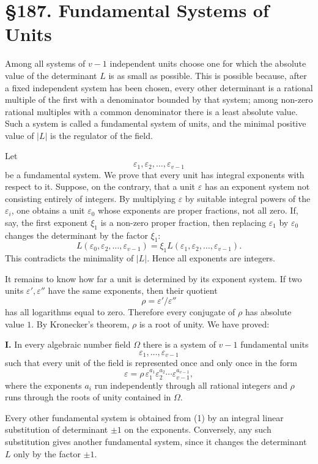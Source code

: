 \documentclass[11pt,a4paper]{book}
\newcommand{\webersection}[2]{\clearpage\section*{\S #1. #2}}
\begin{document}
\webersection{187}{Fundamental Systems of Units}

Among all systems of \(v-1\) independent units choose one for which the absolute value of the determinant \(L\) is as small as possible.  This is possible because, after a fixed independent system has been chosen, every other determinant is a rational multiple of the first with a denominator bounded by that system; among non-zero rational multiples with a common denominator there is a least absolute value.  Such a system is called a fundamental system of units, and the minimal positive value of \(|L|\) is the regulator of the field.

Let
\[
  \varepsilon_1,
\varepsilon_2,
\ldots,
\varepsilon_{v-1}
\tag{1}
\]
be a fundamental system.  We prove that every unit has integral exponents with respect to it.  Suppose, on the contrary, that a unit \(\varepsilon\) has an exponent system not consisting entirely of integers.  By multiplying \(\varepsilon\) by suitable integral powers of the \(\varepsilon_i\), one obtains a unit \(\varepsilon_0\) whose exponents are proper fractions, not all zero.  If, say, the first exponent \(\xi_1\) is a non-zero proper fraction, then replacing \(\varepsilon_1\) by \(\varepsilon_0\) changes the determinant by the factor \(\xi_1\):
\[
  L(\varepsilon_0,
\varepsilon_2,
\ldots,
\varepsilon_{v-1})=
  \xi_1 L(\varepsilon_1,
\varepsilon_2,
\ldots,
\varepsilon_{v-1}).
\tag{2}
\]
This contradicts the minimality of \(|L|\).  Hence all exponents are integers.

It remains to know how far a unit is determined by its exponent system.  If two units \(\varepsilon',\varepsilon''\) have the same exponents, then their quotient
\[
  \rho=\varepsilon'/\varepsilon''
\]
has all logarithms equal to zero.  Therefore every conjugate of \(\rho\) has absolute value \(1\).  By Kronecker's theorem, \(\rho\) is a root of unity.  We have proved:

\textbf{I.} In every algebraic number field \(\Omega\) there is a system of \(v-1\) fundamental units
\[
  \varepsilon_1,
\ldots,
\varepsilon_{v-1}
\]
such that every unit of the field is represented once and only once in the form
\[
  \varepsilon=\rho\,
  \varepsilon_1^{a_1}\varepsilon_2^{a_2}\cdots\varepsilon_{v-1}^{a_{v-1}},
\tag{3}
\]
where the exponents \(a_i\) run independently through all rational integers and \(\rho\) runs through the roots of unity contained in \(\Omega\).

Every other fundamental system is obtained from (1) by an integral linear substitution of determinant \(\pm1\) on the exponents.  Conversely, any such substitution gives another fundamental system, since it changes the determinant \(L\) only by the factor \(\pm1\).
\end{document}

